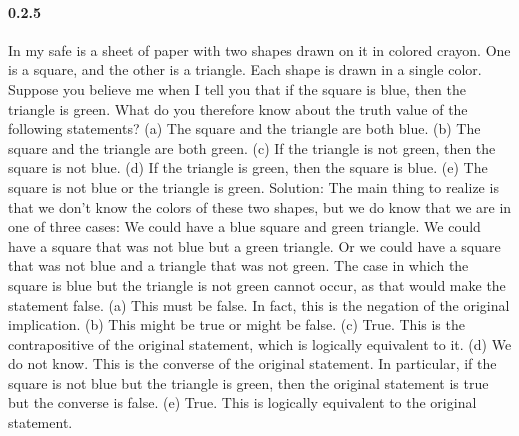\documentclass{article}
\begin{document}
\paragraph{0.2.5}
In my safe is a sheet of paper with two shapes drawn on it in colored
crayon. One is a square, and the other is a triangle. Each shape is
drawn in a single color. Suppose you believe me when I tell you that if
the square is blue, then the triangle is green. What do you therefore know
about the truth value of the following statements?\newline
(a) The square and the triangle are both blue.\newline
(b) The square and the triangle are both green.\newline
(c) If the triangle is not green, then the square is not blue.\newline
(d) If the triangle is green, then the square is blue.\newline
(e) The square is not blue or the triangle is green.\newline
Solution:\newline
The main thing to realize is that we don’t know the colors of these
two shapes, but we do know that we are in one of three cases: We could
have a blue square and green triangle. We could have a square that was
not blue but a green triangle. Or we could have a square that was not blue
and a triangle that was not green. The case in which the square is blue but
the triangle is not green cannot occur, as that would make the statement
false.\newline
(a) This must be false. In fact, this is the negation of the original
implication.\newline
(b) This might be true or might be false.\newline
(c) True. This is the contrapositive of the original statement, which is
logically equivalent to it.\newline
(d) We do not know. This is the converse of the original statement. In
particular, if the square is not blue but the triangle is green, then the
original statement is true but the converse is false.\newline
(e) True. This is logically equivalent to the original statement.
\end{document}
